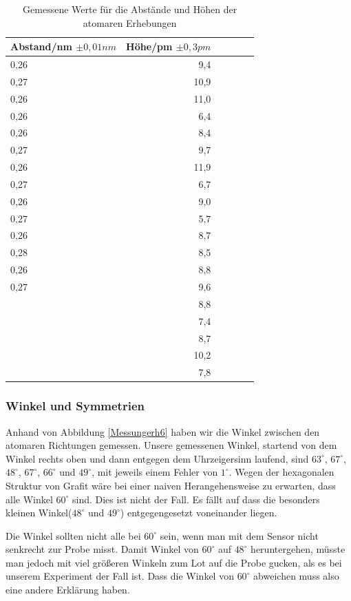\documentclass[10pt,a4paper]{article}
\begin{document}
\begin{table}[h!]
	\centering
	\begin{tabular}{|l|r|c|lrp{16cm}}\hline
		Abstand/nm $\pm 0,01 nm$ & Höhe/pm $\pm 0,3 pm$\\\hline
		0,26 & 9,4 \\
		0,27 & 10,9 \\
		0,26 & 11,0\\
		0,26& 6,4 \\
		0,26 & 8,4 \\
		0,27 & 9,7 \\
		0,26 & 11,9\\
		0,27 & 6,7\\
		0,26 & 9,0\\
		0,27 & 5,7\\
		0,26 & 8,7\\
		0,28 & 8,5\\
		0,26 & 8,8\\
		0,27 & 9,6\\
		& 8,8\\
		& 7,4\\
		& 8,7\\
		& 10,2\\
		& 7,8\\
		\hline
	\end{tabular}
	\caption{Gemessene Werte für die Abstände und Höhen der atomaren Erhebungen}
	\label{Messungerh5}
\end{table}

\subsubsection{Winkel und Symmetrien} \label{winkelsec}

Anhand von Abbildung \ref{Messungerh6} haben wir die Winkel zwischen den atomaren Richtungen gemessen. Unsere gemessenen Winkel, startend von dem Winkel rechts oben und dann entgegen dem Uhrzeigersinn laufend, sind $63^\circ$, $67^\circ$, $48^\circ$, $67^\circ$, $66^\circ$ und $49^\circ$, mit jeweils einem Fehler von $1^\circ$. Wegen der hexagonalen Struktur von Grafit wäre bei einer naiven Herangehensweise zu erwarten, dass alle Winkel $60^\circ$ sind. Dies ist nicht der Fall. Es fällt auf dass die besonders kleinen Winkel($48^\circ$ und $49^\circ$) entgegengesetzt voneinander liegen. 

Die Winkel sollten nicht alle bei $60^\circ$ sein, wenn man mit dem Sensor nicht senkrecht zur Probe misst. Damit Winkel von $60^\circ$ auf $48^\circ$ heruntergehen, müsste man jedoch mit viel größeren Winkeln zum Lot auf die Probe gucken, als es bei unserem Experiment der Fall ist. Dass die Winkel von $60^\circ$ abweichen muss also eine andere Erklärung haben.
\end{document}

